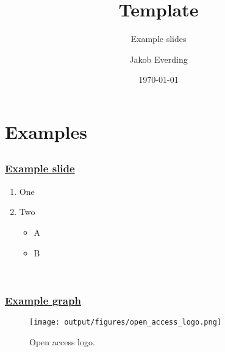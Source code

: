\documentclass[12pt, ngerman]{beamer}
\title{Template}
\subtitle{Example slides}
\author{Jakob Everding} %
\institute{Universit\"at Hamburg}
\date{\today}
\makeatletter
\let\beamer@writeslidentry@miniframeson=\beamer@writeslidentry
\def\beamer@writeslidentry@miniframesoff{%
  \expandafter\beamer@ifempty\expandafter{\beamer@framestartpage}{}%
  {%
    \clearpage\beamer@notesactions%
  }
}
\newcommand*{\miniframeson}{\let\beamer@writeslidentry=\beamer@writeslidentry@miniframeson}
\newcommand*{\miniframesoff}{\let\beamer@writeslidentry=\beamer@writeslidentry@miniframesoff}
\makeatother
\begin{document}
	\nocite{*}
\usebackgroundtemplate{%
\tikz[overlay,remember picture] \node[opacity=1.0, at=(current page.center), xshift=3.8cm, yshift=-2.25cm] {
   \texttt{[image: output/figures/UHH-Siegel.jpg]}};
}
\frame{\titlepage
\thispagestyle{empty}}
\usebackgroundtemplate{ }    %
\addtocounter{framenumber}{-1}

\section{Examples}
\subsection{}
\begin{frame}[label=ex_slide]
\frametitle{\hyperlink{introapp}{Example slide}}
\begin{enumerate}
	\item One
    \pause
	\item Two
	\begin{itemize}
		\item A
		\item B
	\end{itemize}
\end{enumerate}
\vspace{0.5cm}
\hyperlink{ex_table}{} \\
\end{frame}

\begin{frame}[label=ex_slide]
\frametitle{\hyperlink{introapp}{Example graph}}
\begin{figure}[firststage]
	\vspace{-0.2cm}
	\centering
	\caption{Open access logo.}
	\texttt{[image: output/figures/open\_access\_logo.png]}	%
\end{figure}
\vspace{-1cm}
\end{frame}

\miniframesoff
\end{document}
